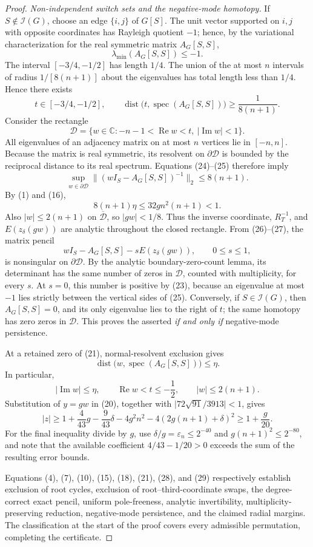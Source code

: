 \documentclass{article}
\begin{document}
\begin{proof}
\emph{Non-independent switch sets and the negative-mode homotopy.}
If \(S\notin\mathcal I(G)\), choose an edge \(\{i,j\}\) of \(G[S]\). The unit vector supported on \(i,j\) with opposite coordinates has Rayleigh quotient \(-1\); hence, by the variational characterization for the real symmetric matrix \(A_G[S,S]\),
\[
 \lambda_{\min}(A_G[S,S])\leq-1.
\tag{23}
\]
The interval \([-3/4,-1/2]\) has length \(1/4\). The union of the at most \(n\) intervals of radius \(1/[8(n+1)]\) about the eigenvalues has total length less than \(1/4\). Hence there exists
\[
 t\in[-3/4,-1/2],\qquad
 \operatorname{dist}\bigl(t,\operatorname{spec}(A_G[S,S])\bigr)
 \geq\frac1{8(n+1)}.
\tag{24}
\]
Consider the rectangle
\[
 \mathcal D=\{w\in\mathbb C:-n-1<\operatorname{Re}w<t,\ 
                         |\operatorname{Im}w|<1\}.
\tag{25}
\]
All eigenvalues of an adjacency matrix on at most \(n\) vertices lie in \([-n,n]\). Because the matrix is real symmetric, its resolvent on \(\partial\mathcal D\) is bounded by the reciprocal distance to its real spectrum. Equations (24)--(25) therefore imply
\[
 \sup_{w\in\partial\mathcal D}
 \|(wI_S-A_G[S,S])^{-1}\|_2\leq8(n+1).
\tag{26}
\]
By (1) and (16),
\[
 8(n+1)\eta\leq32gn^2(n+1)<1.
\tag{27}
\]
Also \(|w|\leq2(n+1)\) on \(\overline{\mathcal D}\), so \(|gw|<1/8\). Thus the inverse coordinate, \(R_T^{-1}\), and \(E(z_\delta(gw))\) are analytic throughout the closed rectangle. From (26)--(27), the matrix pencil
\[
 wI_S-A_G[S,S]-sE(z_\delta(gw)),\qquad 0\leq s\leq1,
\tag{28}
\]
is nonsingular on \(\partial\mathcal D\). By the analytic boundary-zero-count lemma, its determinant has the same number of zeros in \(\mathcal D\), counted with multiplicity, for every \(s\). At \(s=0\), this number is positive by (23), because an eigenvalue at most \(-1\) lies strictly between the vertical sides of (25). Conversely, if \(S\in\mathcal I(G)\), then \(A_G[S,S]=0\), and its only eigenvalue lies to the right of \(t\); the same homotopy has zero zeros in \(\mathcal D\). This proves the asserted \emph{if and only if} negative-mode persistence.

At a retained zero of (21), normal-resolvent exclusion gives
\[
 \operatorname{dist}\bigl(w,\operatorname{spec}(A_G[S,S])\bigr)\leq\eta.
\]
In particular,
\[
 |\operatorname{Im}w|\leq\eta,\qquad
 \operatorname{Re}w<t\leq-\frac12,\qquad
 |w|\leq2(n+1).
\]
Substitution of \(y=gw\) in (20), together with
\(\bigl|72\sqrt{91}/3913\bigr|<1\), gives
\[
 |z|
 \geq1+\frac4{43}g-\frac9{43}\delta
       -4g^2n^2-4(2g(n+1)+\delta)^2
 \geq1+\frac g{20}.
\tag{29}
\]
For the final inequality divide by \(g\), use
\(\delta/g=\varepsilon_n\leq2^{-40}\) and
\(g(n+1)^2\leq2^{-80}\), and note that the available coefficient
\(4/43-1/20>0\) exceeds the sum of the resulting error bounds.

Equations (4), (7), (10), (15), (18), (21), (28), and (29) respectively establish exclusion of root cycles, exclusion of root--third-coordinate swaps, the degree-correct exact pencil, uniform pole-freeness, analytic invertibility, multiplicity-preserving reduction, negative-mode persistence, and the claimed radial margins. The classification at the start of the proof covers every admissible permutation, completing the certificate.
\end{proof}
\end{document}
